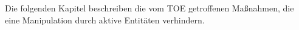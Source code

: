 
Die folgenden Kapitel beschreiben die vom TOE getroffenen Maßnahmen, die
eine Manipulation durch aktive Entitäten verhindern.


